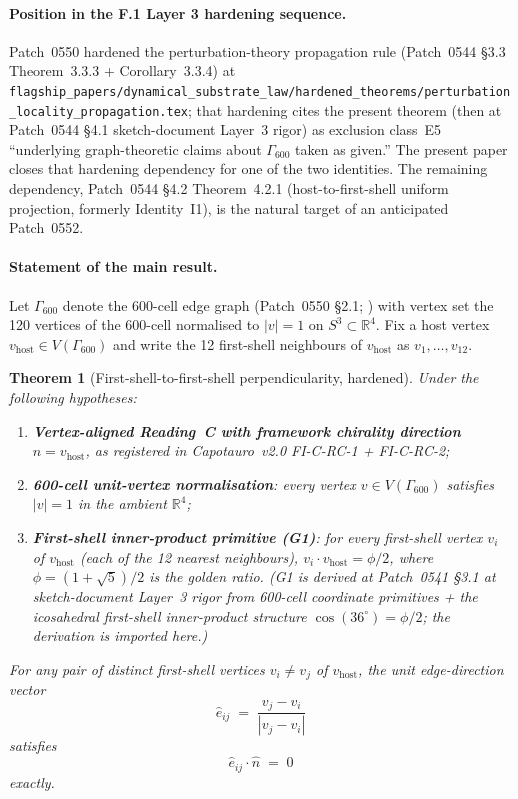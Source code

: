 \documentclass[11pt,letterpaper]{article}
\newtheorem{theorem}{Theorem}[section]
\newcommand{\nhat}{\hat{n}}
\newcommand{\vhost}{v_{\text{host}}}
\newcommand{\Gsixcell}{\Gamma_{600}}
\newcommand{\Reals}{\mathbb{R}}
\begin{document}
\paragraph{Position in the F.1 Layer 3 hardening sequence.}
Patch~0550 hardened the perturbation-theory propagation rule (Patch~0544 \S3.3 Theorem~3.3.3 + Corollary~3.3.4) at \texttt{flagship\_papers/dynamical\_substrate\_law/hardened\_theorems/perturbation\_locality\_propagation.tex}; that hardening cites the present theorem (then at Patch~0544 \S4.1 sketch-document Layer~3 rigor) as exclusion class~E5 ``underlying graph-theoretic claims about $\Gsixcell$ taken as given.'' The present paper closes that hardening dependency for one of the two identities. The remaining dependency, Patch~0544 \S4.2 Theorem~4.2.1 (host-to-first-shell uniform projection, formerly Identity~I1), is the natural target of an anticipated Patch~0552.

\paragraph{Statement of the main result.}
Let $\Gsixcell$ denote the 600-cell edge graph (Patch~0550 \S2.1; \cite{coxeter1973}) with vertex set the 120 vertices of the 600-cell normalised to $|v|=1$ on $S^3 \subset \Reals^4$. Fix a host vertex $\vhost \in V(\Gsixcell)$ and write the 12 first-shell neighbours of $\vhost$ as $v_1, \ldots, v_{12}$.

\begin{theorem}[First-shell-to-first-shell perpendicularity, hardened]\label{thm:first_shell_perpendicularity}
Under the following hypotheses:
\begin{enumerate}[label=(H\arabic*)]
\item \textbf{Vertex-aligned Reading~C with framework chirality direction $\nhat = \vhost$}, as registered in Capotauro~v2.0 FI-C-RC-1 + FI-C-RC-2;
\item \textbf{600-cell unit-vertex normalisation}: every vertex $v \in V(\Gsixcell)$ satisfies $|v| = 1$ in the ambient $\Reals^4$;
\item \textbf{First-shell inner-product primitive (G1)}: for every first-shell vertex $v_i$ of $\vhost$ (each of the 12 nearest neighbours), $v_i \cdot \vhost = \phi/2$, where $\phi = (1+\sqrt{5})/2$ is the golden ratio. (G1 is derived at Patch~0541 \S3.1 at sketch-document Layer~3 rigor from 600-cell coordinate primitives + the icosahedral first-shell inner-product structure $\cos(36^\circ) = \phi/2$; the derivation is imported here.)
\end{enumerate}
For any pair of distinct first-shell vertices $v_i \neq v_j$ of $\vhost$, the unit edge-direction vector
\begin{equation}\label{eq:edge_direction_definition}
\hat{e}_{ij} \;=\; \frac{v_j - v_i}{|v_j - v_i|}
\end{equation}
satisfies
\begin{equation}\label{eq:first_shell_perpendicularity}
\hat{e}_{ij} \cdot \nhat \;=\; 0
\end{equation}
exactly.
\end{theorem}
\end{document}
